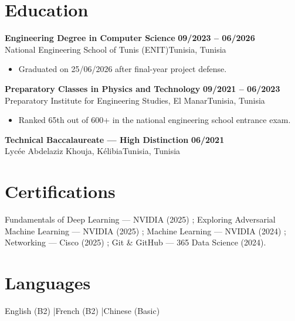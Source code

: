 \documentclass[a4paper,10pt]{article}
\newcommand{\cventry}[4]{%
  \textbf{#1} \hfill \textbf{#4}\\[1pt]
  #2{\ifx\relax#3\relax\else, #3\fi}\par\vspace{2pt}}
\begin{document}
\section{Education}
\cventry{Engineering Degree in Computer Science}{National Engineering School of Tunis (ENIT)}{Tunisia}{09/2023 -- 06/2026}
\begin{itemize}
  \item Graduated on 25/06/2026 after final-year project defense.
\end{itemize}
\cventry{Preparatory Classes in Physics and Technology}{Preparatory Institute for Engineering Studies, El Manar}{Tunisia}{09/2021 -- 06/2023}
\begin{itemize}
  \item Ranked 65th out of 600+ in the national engineering school entrance exam.
\end{itemize}
\cventry{Technical Baccalaureate — High Distinction}{Lycée Abdelaziz Khouja, Kélibia}{Tunisia}{06/2021}
\section{Certifications}
Fundamentals of Deep Learning — NVIDIA (2025) ; Exploring Adversarial Machine Learning — NVIDIA (2025) ; Machine Learning — NVIDIA (2024) ; Networking — Cisco (2025) ; Git \& GitHub — 365 Data Science (2024).
\section{Languages}
English (B2) \quad|\quad French (B2) \quad|\quad Chinese (Basic)
\end{document}
